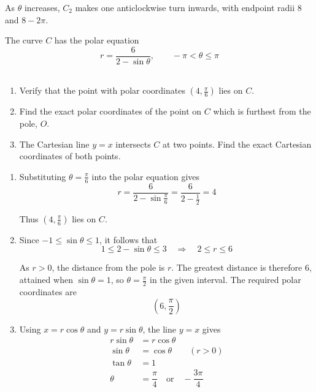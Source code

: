 \documentclass[leqno]{article}
\begin{document}
\begin{enumerate}[
  label=\textbf{\arabic*.},
  leftmargin=*,
  topsep=0pt,
  partopsep=0pt,
  parsep=0pt
]
\begin{djsSolution}
\begin{enumerate}[label=\textbf{(\alph*)}, start=1]
As \(\theta\) increases, \(C_2\) makes one anticlockwise turn inwards, with endpoint radii \(8\) and \(8-2\pi\).
\end{enumerate}
\end{djsSolution}

\newpage

\questionitem

The curve $C$ has the polar equation
\[
r=\frac{6}{2-\sin\theta},\qquad -\pi<\theta\leq\pi
\] \\
\begin{enumerate}[label=\textbf{(\alph*)}]
\item Verify that the point with polar coordinates $\left(4,\frac{\pi}{6}\right)$ lies on $C$.  \\
\item Find the exact polar coordinates of the point on $C$ which is furthest from the pole, $O$.  \\
\item The Cartesian line $y=x$ intersects $C$ at two points. Find the exact Cartesian coordinates of both points.  \\
\end{enumerate}

\vspace*{10pt}

\begin{djsSolution}
\begin{enumerate}[label=\textbf{(\alph*)}, start=1]
\item Substituting \(\theta=\frac{\pi}{6}\) into the polar equation gives
\[
r=\dfrac{6}{2-\sin\frac{\pi}{6}}=\dfrac{6}{2-\frac12}=4
\]

Thus \(\left(4,\frac{\pi}{6}\right)\) lies on \(C\).

\item Since \(-1\leq\sin\theta\leq1\), it follows that
\[
1\leq 2-\sin\theta\leq3
\quad\Longrightarrow\quad
2\leq r\leq6
\]

As \(r>0\), the distance from the pole is \(r\). The greatest distance is therefore \(6\), attained when \(\sin\theta=1\), so \(\theta=\frac{\pi}{2}\) in the given interval. The required polar coordinates are
\[
\left(6,\dfrac{\pi}{2}\right)
\]

\item Using \(x=r\cos\theta\) and \(y=r\sin\theta\), the line \(y=x\) gives
\begin{align*}
r\sin\theta&=r\cos\theta\\
\sin\theta&=\cos\theta \qquad (r>0)\\
\tan\theta&=1\\
\theta&=\dfrac{\pi}{4}\quad\text{or}\quad-\dfrac{3\pi}{4}
\end{align*}


\end{enumerate}
\end{djsSolution}
\end{enumerate}
\end{document}
